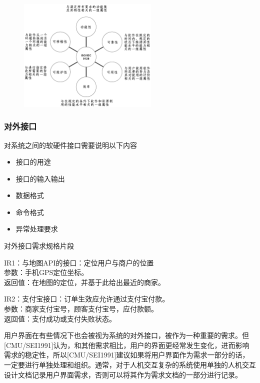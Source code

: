 \begin{figure}[H]
	\centering
	\includegraphics[width=0.6\textwidth]{img/质量属性举例.png}
\end{figure}

\subsubsection{对外接口}
对系统之间的软硬件接口需要说明以下内容
\vspace{-0.8em}
\begin{multicols}{3}
\begin{itemize}
    \item 接口的用途
    \item 接口的输入输出
    \item 数据格式
    \item 命令格式
    \item 异常处理要求
\end{itemize}
\end{multicols}
\vspace{-1em}

对外接口需求规格片段
{\kaishu 
\vspace{-0.8em}
\begin{multicols}{2}
    \columnseprule=0.8pt
    IR1：与地图API的接口：定位用户与商户的位置 \\
    参数：手机GPS定位坐标。\\
    返回值：在地图的定位，并基于此给出最近的商家。
    
    IR2：支付宝接口：订单生效应允许通过支付宝付款。\\
    参数：商家支付宝号，顾客支付宝号，应付款额。\\
    返回值：支付成功或支付失败状态。
\end{multicols}
\vspace{-1em}}

用户界面在有些情况下也会被视为系统的对外接口，被作为一种重要的需求。但[CMU/SEI1991]认为，和其他需求相比，用户的界面更经常发生变化，进而影响需求的稳定性，所以[CMU/SEI1991]建议如果将用户界面作为需求一部分的话，一定要进行单独处理和组织。通常，对于人机交互复杂的系统使用单独的人机交互设计文档记录用户界面需求，否则可以将其作为需求文档的一部分进行记录。

